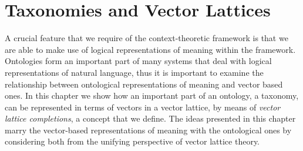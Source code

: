  
% 
 
% 
 
 \chapter{Taxonomies and Vector Lattices}
 \label{ontologies}
 
A crucial feature that we require of the context-theoretic framework is that we are able to make use of logical representations of meaning within the framework. Ontologies form an important part of many systems that deal with logical representations of natural language, thus it is important to examine the relationship between ontological representations of meaning and vector based ones. In this chapter we show how an important part of an ontology, a taxonomy, can be represented in terms of vectors in a vector lattice, by means of \emph{vector lattice completions}, a concept that we define. The ideas presented in this chapter marry the vector-based representations of meaning with the ontological ones by considering both from the unifying perspective of vector lattice theory.

